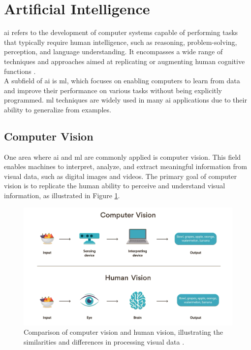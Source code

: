 \section{Artificial Intelligence} 
\label{sec:artificial-intelligence}

\gls{ai} refers to the development of computer systems capable of performing tasks that typically require human intelligence, such as reasoning, problem-solving, perception, and language understanding. It encompasses a wide range of techniques and approaches aimed at replicating or augmenting human cognitive functions \cite{ibm:ai}. \\

A subfield of \gls{ai} is \gls{ml}, which focuses on enabling computers to learn from data and improve their performance on various tasks without being explicitly programmed. \gls{ml} techniques are widely used in many \gls{ai} applications due to their ability to generalize from examples. \\

\subsection{Computer Vision}

One area where \gls{ai} and \gls{ml} are commonly applied is computer vision. This field enables machines to interpret, analyze, and extract meaningful information from visual data, such as digital images and videos. The primary goal of computer vision is to replicate the human ability to perceive and understand visual information, as illustrated in Figure \ref{fig:computer-vision}.

\begin{figure}[h!] \centering \includegraphics[width=0.85\linewidth]{figures/theory/machine-learning/computer-vision.png} \caption[Computer vision vs. human vision]{Comparison of computer vision and human vision, illustrating the similarities and differences in processing visual data \cite{turing:computer-vision}.} \label{fig:computer-vision} \end{figure}

